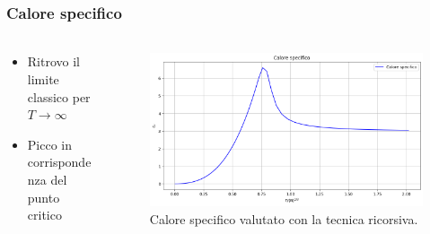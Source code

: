 \begin{frame}
    \frametitle{Calore specifico}
    \framesubtitle{}

    \begin{columns}
        \begin{column}{0.3\textwidth}
            \begin{itemize}[itemsep=0.5em, label=$\bullet$]
                \item Ritrovo il limite classico per $T \rightarrow \infty$
                \item Picco in corrispondenza del punto critico
            \end{itemize}
        \end{column}
        
        \begin{column}{0.7\textwidth}
          \begin{figure}
              \includegraphics[width=\textwidth]{Immagini/calSpeRic.png}
              \caption{Calore specifico valutato con la tecnica ricorsiva.}
          \end{figure}
        \end{column}
      \end{columns}
  
\end{frame}
